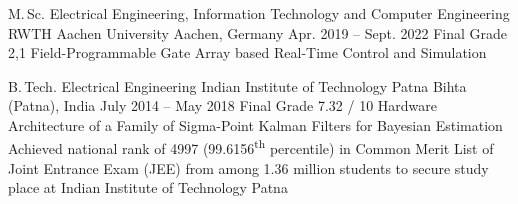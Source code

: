 
\begin{cveducation}

\cvschool
	{M.\,Sc.} %
	{Electrical Engineering, Information Technology and Computer Engineering} %
	{RWTH Aachen University} %
	{Aachen, Germany} %
	{Apr. 2019 -- Sept. 2022} %
	{Final Grade 2,1} %
	{Field-Programmable Gate Array based Real-Time Control and Simulation} %
	{}

\cvschool
	{B.\,Tech.} %
	{Electrical Engineering} %
	{Indian Institute of Technology Patna} %
	{Bihta (Patna), India} %
	{July 2014 -- May 2018} %
	{Final Grade 7.32 / 10} %
	{Hardware Architecture of a Family of Sigma-Point Kalman Filters for Bayesian Estimation} %
	{Achieved national rank of 4997 (99.6156\textsuperscript{th} percentile) in Common Merit List of Joint Entrance Exam (JEE) from among 1.36 million students to secure study place at Indian Institute of Technology Patna} %



\end{cveducation}

